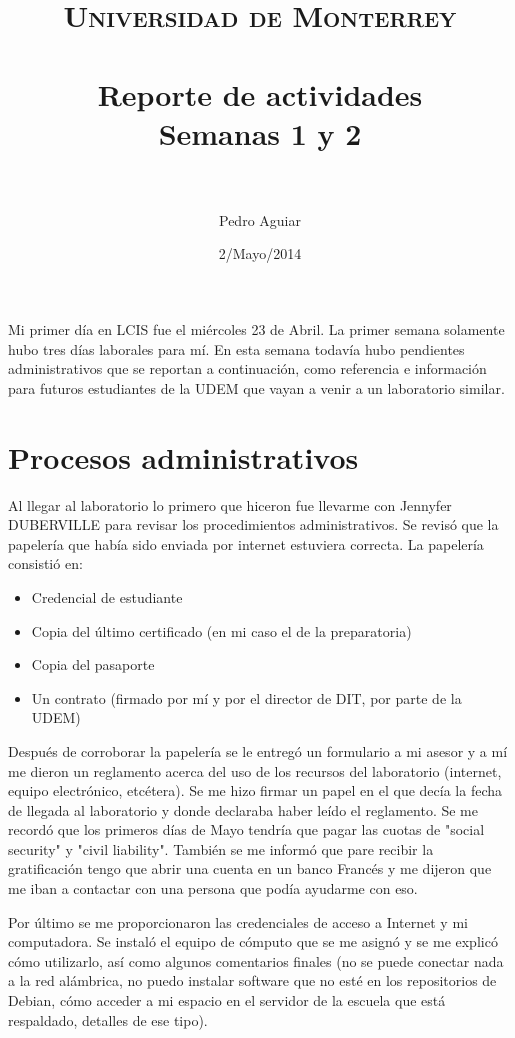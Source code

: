 \documentclass[paper=a4, fontsize=11pt]{scrartcl} %
\title{	
\normalfont \normalsize 
\textsc{Universidad de Monterrey} \\ [25pt] 
\horrule{1pt} \\[0.4cm]
\huge Reporte de actividades \\ 
\small Semanas 1 y 2 \\
\horrule{2pt} \\[0.5cm]
}
\author{Pedro Aguiar}
\date{\normalsize 2/Mayo/2014}
\numberwithin{equation}{section}
\numberwithin{figure}{section}
\numberwithin{table}{section}
\begin{document}
\maketitle

Mi primer d\'{i}a en LCIS fue el mi\'{e}rcoles 23 de Abril. La primer semana solamente hubo tres d\'{i}as laborales para m\'{i}. En esta semana todav\'{i}a hubo pendientes administrativos que se reportan a continuaci\'{o}n, como referencia e informaci\'{o}n para futuros estudiantes de la UDEM que vayan a venir a un laboratorio similar.

\section{Procesos administrativos}
Al llegar al laboratorio lo primero que hiceron fue llevarme con Jennyfer DUBERVILLE para revisar los procedimientos administrativos. Se revis\'{o} que la papeler\'{i}a que hab\'{i}a sido enviada por internet estuviera correcta. La papeler\'{i}a consisti\'{o} en:
\begin{itemize}
	\item Credencial de estudiante
	\item Copia del \'{u}ltimo certificado (en mi caso el de la preparatoria)
	\item Copia del pasaporte
	\item Un contrato (firmado por m\'{i} y por el director de DIT, por parte de la UDEM)
\end{itemize}
Despu\'{e}s de corroborar la papeler\'{i}a se le entreg\'{o} un formulario a mi asesor y a m\'{i} me dieron un reglamento acerca del uso de los recursos del laboratorio (internet, equipo electr\'{o}nico, etc\'{e}tera). Se me hizo firmar un papel en el que dec\'{i}a la fecha de llegada al laboratorio y donde declaraba haber le\'{i}do el reglamento. Se me record\'{o} que los primeros d\'{i}as de Mayo tendr\'{i}a que pagar las cuotas de "social security" y "civil liability". Tambi\'{e}n se me inform\'{o} que pare recibir la gratificaci\'{o}n tengo que abrir una cuenta en un banco Franc\'{e}s y me dijeron que me iban a contactar con una persona que pod\'{i}a ayudarme con eso.

Por \'{u}ltimo se me proporcionaron las credenciales de acceso a Internet y mi computadora. Se instal\'{o} el equipo de c\'{o}mputo que se me asign\'{o} y se me explic\'{o} c\'{o}mo utilizarlo, as\'{i} como algunos comentarios finales (no se puede conectar nada a la red al\'{a}mbrica, no puedo instalar software que no est\'{e} en los repositorios de Debian, c\'{o}mo acceder a mi espacio en el servidor de la escuela que est\'{a} respaldado, detalles de ese tipo).
\end{document}
